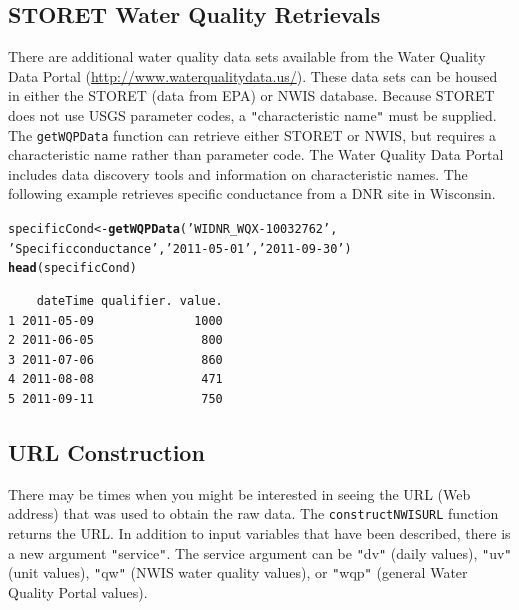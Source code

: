 \documentclass[a4paper,11pt]{article}\usepackage[]{graphicx}\usepackage[]{color}
\makeatletter
\newcommand{\hlstr}[1]{\textcolor[rgb]{0.192,0.494,0.8}{#1}}%
\newcommand{\hlstd}[1]{\textcolor[rgb]{0.345,0.345,0.345}{#1}}%
\newcommand{\hlkwb}[1]{\textcolor[rgb]{0.69,0.353,0.396}{#1}}%
\newcommand{\hlkwd}[1]{\textcolor[rgb]{0.737,0.353,0.396}{\textbf{#1}}}%
\newenvironment{kframe}{%
 \def\at@end@of@kframe{}%
 \ifinner\ifhmode%
  \def\at@end@of@kframe{\end{minipage}}%
  \begin{minipage}{\columnwidth}%
 \fi\fi%
 \def\FrameCommand##1{\hskip\@totalleftmargin \hskip-\fboxsep
 \colorbox{shadecolor}{##1}\hskip-\fboxsep
     \hskip-\linewidth \hskip-\@totalleftmargin \hskip\columnwidth}%
 \MakeFramed {\advance\hsize-\width
   \@totalleftmargin\z@ \linewidth\hsize
   \@setminipage}}%
 {\par\unskip\endMakeFramed%
 \at@end@of@kframe}
\newenvironment{knitrout}{}{} %
\makeatother
\begin{document}
\subsection{STORET Water Quality Retrievals}
\label{sec:usgsSTORET}
There are additional water quality data sets available from the Water Quality Data Portal (\url{http://www.waterqualitydata.us/}).  These data sets can be housed in either the STORET (data from EPA) or NWIS database.  Because STORET does not use USGS parameter codes, a \texttt{"}characteristic name\texttt{"} must be supplied.  The \texttt{getWQPData} function can retrieve either STORET or NWIS, but requires a characteristic name rather than parameter code. The Water Quality Data Portal includes data discovery tools and information on characteristic names. The following example retrieves specific conductance from a DNR site in Wisconsin. 


\begin{knitrout}
\color{fgcolor}\begin{kframe}
\begin{alltt}
\hlstd{specificCond} \hlkwb{<-} \hlkwd{getWQPData}\hlstd{(}\hlstr{'WIDNR_WQX-10032762'}\hlstd{,}
                \hlstr{'Specific conductance'}\hlstd{,}\hlstr{'2011-05-01'}\hlstd{,}\hlstr{'2011-09-30'}\hlstd{)}
\hlkwd{head}\hlstd{(specificCond)}
\end{alltt}
\begin{verbatim}
    dateTime qualifier. value.
1 2011-05-09              1000
2 2011-06-05               800
3 2011-07-06               860
4 2011-08-08               471
5 2011-09-11               750
\end{verbatim}
\end{kframe}
\end{knitrout}

\FloatBarrier
\subsection{URL Construction}
\label{sec:usgsURL}
There may be times when you might be interested in seeing the URL (Web address) that was used to obtain the raw data. The \texttt{constructNWISURL} function returns the URL.  In addition to input variables that have been described, there is a new argument \texttt{"}service\texttt{"}. The service argument can be \texttt{"}dv\texttt{"} (daily values), \texttt{"}uv\texttt{"} (unit values), \texttt{"}qw\texttt{"} (NWIS water quality values), or \texttt{"}wqp\texttt{"} (general Water Quality Portal values).
 
\end{document}
